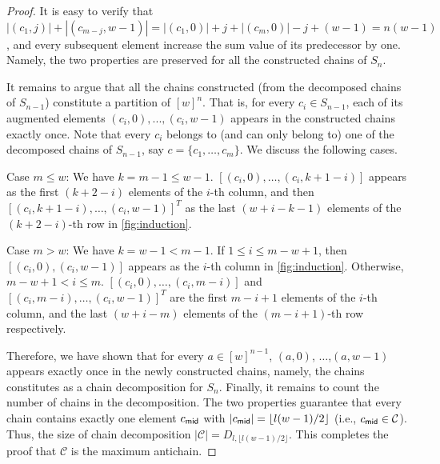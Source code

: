 \begin{proof}
       
      
It is easy to verify that $|(c_{1}, j)| + |(c_{m - j}, w-1)| = |(c_{1}, 0)|+j + |(c_{m}, 0)|- j+(w-1) = n(w-1)$, and every subsequent element increase the sum value of its predecessor by one. Namely, the two properties are preserved for all the constructed chains of $S_{n}$. 
     
It remains to argue that all the chains constructed (from the decomposed chains of  $S_{n-1}$) constitute a  partition of $[w]^n$. 
That is, for every  $c_i \in S_{n-1}$, each of its augmented elements $(c_i,0),...,(c_i,w-1)$ appears in the constructed chains exactly once. Note that every $c_i$ belongs to (and can only belong to) one of the decomposed chains of  $S_{n-1}$, say $c=\{c_1,\ldots, c_m\}$. We discuss the following cases.
     
Case $m\leq w$: We have $k=m-1\leq w-1$. $[(c_i,0),\ldots, (c_i,k+1-i)]$
appears as the first $(k+2-i)$ elements of the $i$-th column, and then $[(c_i,k+1-i),\ldots, (c_i,w-1)]^T$ as the last $(w+i-k-1)$ elements of the $(k+2-i)$-th row in \cref{fig:induction}. 
    
Case $m> w$: We have $k=w-1 < m-1$. If $1\leq i\leq m-w+1$, then $[(c_i,0),(c_i,w-1)]$ appears as the $i$-th column in \cref{fig:induction}. Otherwise, $m-w+1<i\leq m$. $[(c_i,0),\ldots, (c_i,m-i)]$ and $[(c_i,m-i),\ldots, (c_i,w-1)]^T$
are  the first $m-i+1$ elements of the $i$-th column, and the last $(w+i-m)$ elements of the $(m-i+1)$-th row respectively.
     
Therefore, we have shown that for every $a \in [w]^{n-1}$, $(a, 0)$, $\ldots$,$(a,w-1)$ appears exactly once in the newly constructed chains, namely, the chains constitutes as a chain decomposition for $S_n$. Finally, it remains to count the number of chains in the decomposition. 
The two properties guarantee  that every chain contains exactly one element $c_{\sf mid}$ with $|c_{\sf mid}|=\lfloor l(w-1)/2 \rfloor$ (i.e., $c_{\sf mid} \in \mathcal{C}$). Thus, the size of chain decomposition $|\mathcal{C}| = D_{l, \lfloor{l(w-1)/2}\rfloor}$. This completes the proof that $\mathcal{C}$ is the maximum antichain.
 
\end{proof}


